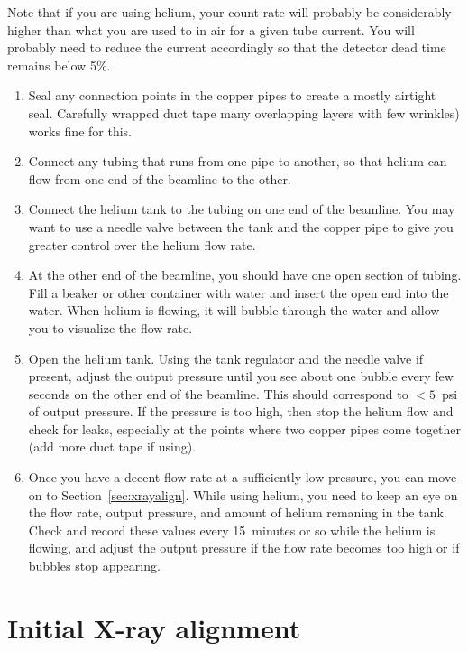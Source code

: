 Note that if you are using helium, your count rate will probably be considerably higher than what you are used to in air for a given tube current. You will probably need to reduce the current accordingly so that the detector dead time remains below 5\%.

\begin{enumerate}

\item Seal any connection points in the copper pipes to create a mostly airtight seal. Carefully wrapped duct tape many overlapping layers with few wrinkles) works fine for this.

\item Connect any tubing that runs from one pipe to another, so that helium can flow from one end of the beamline to the other.

\item Connect the helium tank to the tubing on one end of the beamline. You may want to use a needle valve between the tank and the copper pipe to give you greater control over the helium flow rate.

\item At the other end of the beamline, you should have one open section of tubing. Fill a beaker or other container with water and insert the open end into the water. When helium is flowing, it will bubble through the water and allow you to visualize the flow rate.

\item Open the helium tank. Using the tank regulator and the needle valve if present, adjust the output pressure until you see about one bubble every few seconds on the other end of the beamline. This should correspond to $<5$~psi of output pressure. If the pressure is too high, then stop the helium flow and check for leaks, especially at the points where two copper pipes come together (add more duct tape if using).

\item Once you have a decent flow rate at a sufficiently low pressure, you can move on to Section~\ref{sec:xrayalign}. While using helium, you need to keep an eye on the flow rate, output pressure, and amount of helium remaning in the tank. Check and record these values every 15~minutes or so while the helium is flowing, and adjust the output pressure if the flow rate becomes too high or if bubbles stop appearing.

\end{enumerate}

\section{Initial X-ray alignment\label{sec:xrayalign}}

